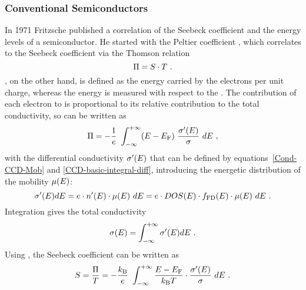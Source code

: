 \subsubsection{Conventional Semiconductors}%
\label{sec:TheoFritzsche}
In 1971 Fritzsche published a correlation of the Seebeck coefficient and the energy levels of a semiconductor\cite{Fritzsche1971}. He started with the Peltier
coefficient \peltier, which correlates to the Seebeck coefficient via the Thomson
relation
\begin{equation}
\peltier = \S \cdot T
\label{eq:PeltierSeebeck}
\PUNKT
\end{equation}
\peltier, on the other hand, is defined as the energy carried by the electrons per unit charge, whereas the energy is measured with respect to the \EfLong \Ef. The contribution of each electron to \peltier is proportional to its relative contribution to the total conductivity, so \peltier can be written as\cite{Fritzsche1971}
\begin{equation}
\peltier = - \frac{1}{e} ~ \int_{-\infty} ^{+\infty} (E-\Ef) ~ \frac{\c'(E)}{\c} ~ dE
\label{eq:PeltierIntegral}
\KOMMA
\end{equation}
with the differential conductivity $\c'(E)$ that can be defined by equations~\eqref{Cond-CCD-Mob} and \eqref{CCD-basic-integral-diff}, introducing the energetic distribution of the mobility $\mob(E)$:
\begin{equation}
 \c'(E) dE = e \cdot n'(E) \cdot \mob(E) ~dE = e \cdot \dos(E) \cdot \fFD(E) \cdot \mob(E) ~dE
\label{eq:DiffCond}
\PUNKT
\end{equation}
Integration gives the total conductivity
\begin{equation}
 \c(E) = \int_{-\infty} ^{+\infty} \c'(E) dE
\PUNKT
\end{equation}
Using , the Seebeck coefficient can be written as
\begin{equation}\label{eq:SeebeckIntFritzsche}
\S = \frac{\peltier}{T}=  - \frac{\kB}{e} ~ \int_{-\infty} ^{+\infty} \frac{E-\Ef}{\kT} \cdot \frac{\c'(E)}{\c} ~ dE
\PUNKT
\end{equation}

